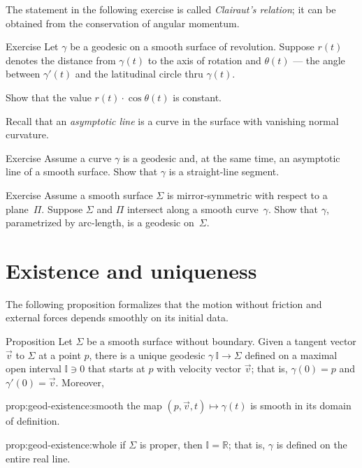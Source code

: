 The statement in the following exercise is called \emph{Clairaut's relation};
it can be obtained from the conservation of angular momentum.

\begin{thm}{Exercise}\label{ex:clairaut}
Let $\gamma$ be a geodesic on a smooth surface of revolution.
Suppose $r(t)$ denotes the distance from $\gamma(t)$ to the axis of rotation
and $\theta(t)$ --- the angle between $\gamma'(t)$ and the latitudinal circle thru $\gamma(t)$. 

Show that the value $r(t)\cdot \cos\theta(t)$ is constant. 
\end{thm}


Recall that an {}\emph{asymptotic line} is a curve in the surface with vanishing normal curvature.

\begin{thm}{Exercise}\label{ex:asymptotic-geodesic}
Assume a curve $\gamma$ is a geodesic and, at the same time, an asymptotic line of a smooth surface.
Show that $\gamma$ is a straight-line segment.
\end{thm}


\begin{thm}{Exercise}\label{ex:reflection-geodesic}
Assume a smooth surface $\Sigma$ is mirror-symmetric with respect to a plane~$\Pi$.
Suppose $\Sigma$ and $\Pi$ intersect along a smooth curve~$\gamma$.
Show that $\gamma$, parametrized by arc-length, is a geodesic on~$\Sigma$.
\end{thm}



\section{Existence and uniqueness}

The following proposition formalizes that the motion without friction and external forces depends smoothly on its initial data. 

\begin{thm}{Proposition}\label{prop:geod-existence} 
Let $\Sigma$ be a smooth surface without boundary.
Given a tangent vector ${\vec v}$ to $\Sigma$ at a point $p$,
there is a unique geodesic $\gamma\:\mathbb{I}\to \Sigma$ defined on a maximal open interval $\mathbb{I}\ni 0$ that starts at $p$ with velocity vector ${\vec v}$;
that is, $\gamma(0)=p$ and $\gamma'(0)={\vec v}$.
Moreover,
\begin{subthm}{prop:geod-existence:smooth} the map $(p,{\vec v},t)\mapsto \gamma(t)$ is smooth in its domain of definition.
\end{subthm}

\begin{subthm}{prop:geod-existence:whole}
if $\Sigma$ is proper, then $\mathbb{I}=\mathbb{R}$; that is, $\gamma$ is defined on the entire real line.
\end{subthm}

\end{thm}

